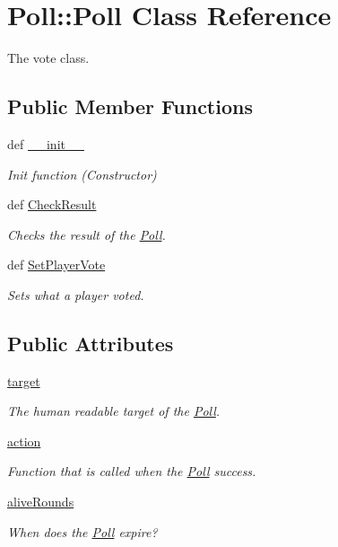 \hypertarget{class_poll_1_1_poll}{
\section{\-Poll\-:\-:\-Poll \-Class \-Reference}
\label{class_poll_1_1_poll}
}


\-The vote class.  


\subsection*{\-Public \-Member \-Functions}
\begin{DoxyCompactItemize}
\item 
def \hyperlink{class_poll_1_1_poll_af39ee012b51f66471e429d0fce6d2a60}{\-\_\-\-\_\-init\-\_\-\-\_\-}
\begin{DoxyCompactList}\small\item\em \-Init function (\-Constructor) \end{DoxyCompactList}\item 
def \hyperlink{class_poll_1_1_poll_a4f68e25ba912c163462a50fe2197e8c7}{\-Check\-Result}
\begin{DoxyCompactList}\small\item\em \-Checks the result of the \hyperlink{class_poll_1_1_poll}{\-Poll}. \end{DoxyCompactList}\item 
def \hyperlink{class_poll_1_1_poll_a63dd1c17fe8f6ef6d6b3afb690157988}{\-Set\-Player\-Vote}
\begin{DoxyCompactList}\small\item\em \-Sets what a player voted. \end{DoxyCompactList}\end{DoxyCompactItemize}
\subsection*{\-Public \-Attributes}
\begin{DoxyCompactItemize}
\item 
\hyperlink{class_poll_1_1_poll_a4ba15cd9aa2b52ac8226eb969679632f}{target}
\begin{DoxyCompactList}\small\item\em \-The human readable target of the \hyperlink{class_poll_1_1_poll}{\-Poll}. \end{DoxyCompactList}\item 
\hyperlink{class_poll_1_1_poll_a94dd36f9a7715b95458df8e87aa5debc}{action}
\begin{DoxyCompactList}\small\item\em \-Function that is called when the \hyperlink{class_poll_1_1_poll}{\-Poll} success. \end{DoxyCompactList}\item 
\hyperlink{class_poll_1_1_poll_a6784d251ce1b468a297aec9d1a8deb30}{alive\-Rounds}
\begin{DoxyCompactList}\small\item\em \-When does the \hyperlink{class_poll_1_1_poll}{\-Poll} expire? \end{DoxyCompactList}\end{DoxyCompactItemize}
